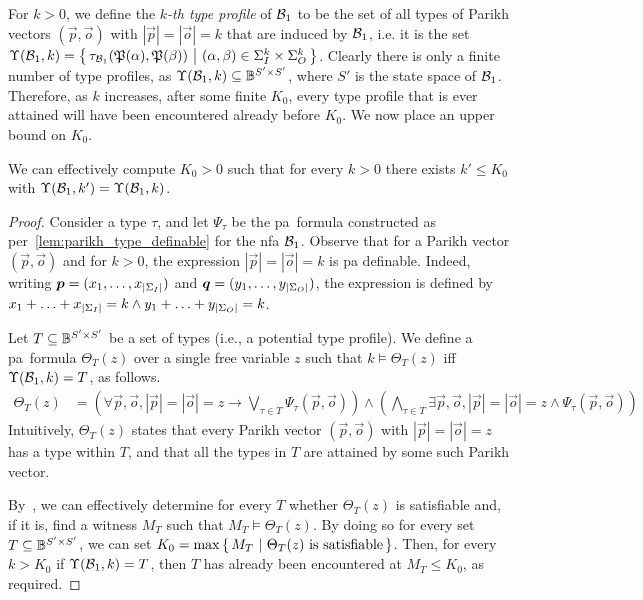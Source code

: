 For $k>0$, we define the \emph{$k$-th type profile} of $\mathcal{B}_1$ to be the set of all types of Parikh vectors $(\vec{p},\vec{o})$ with $|\vec{p}|=|\vec{o}|=k$ that are induced by $\mathcal{B}_1$, i.e. it is the set $\Upsilon(\mathcal{B}_1,k)=\left\{\,\tau_{\mathcal{B}_1}(\mathfrak{P}(\alpha),\mathfrak{P}(\beta))\ \middle|\ (\alpha,\beta)\in \Sigma_{I}^k \times \Sigma_{O}^k\,\right\}$. Clearly there is only a finite number of type profiles, as $\Upsilon(\mathcal{B}_1,k)\subseteq \mathbb{B}^{S'\times S'}$, where $S'$ is the state space of $\mathcal{B}_1$. Therefore, as $k$ increases, after some finite $K_0$, every type profile that is ever attained will have been encountered already before $K_0$. We now place an upper bound on $K_0$.

\begin{lemma}
	\label{lem:type_profile_bound}
	We can effectively compute $K_0>0$ such that for every $k>0$ there exists $k'\le K_0$ with $\Upsilon(\mathcal{B}_1,k')=\Upsilon(\mathcal{B}_1,k)$.
	\end{lemma}
\begin{proof}
	Consider a type $\tau$, and let $\Psi_\tau$ be the \gls{pa}~formula constructed as per~\cref{lem:parikh_type_definable} for the \gls{nfa} $\mathcal{B}_1$. Observe that for a Parikh vector $(\vec{p},\vec{o})$ and for $k>0$, the expression $|\vec{p}|=|\vec{o}|=k$ is \gls{pa} definable. Indeed, writing $\boldsymbol{p}=(x_1,\ldots,x_{|\Sigma_{I}|})$ and $\boldsymbol{q}=(y_1,\ldots,y_{|\Sigma_{O}|})$, the expression is defined by $x_1+\ldots+x_{|\Sigma_{I}|}=k \wedge y_1+\ldots+y_{|\Sigma_{O}|}=k$.
	
	Let $T\subseteq \mathbb{B}^{S'\times S'}$ be a set of types (i.e., a potential type profile). We define a \gls{pa}~formula $\Theta_T(z)$ over a single free variable $z$ such that $k\models \Theta_T(z)$ iff $\Upsilon(\mathcal{B}_1,k)=T$, as follows.
	\begin{align*}
		\Theta_T(z)&=\left(\forall \vec{p},\vec{o}, |\vec{p}|=|\vec{o}|=z \to \bigvee_{\tau\in T}\Psi_\tau(\vec{p},\vec{o})\right)
		\wedge \left(\bigwedge_{\tau\in T}\exists \vec{p},\vec{o}, |\vec{p}|=|\vec{o}|=z \wedge \Psi_\tau(\vec{p},\vec{o})\right)
	\end{align*}
Intuitively, $\Theta_T(z)$ states that every Parikh vector $(\vec{p},\vec{o})$ with $|\vec{p}|=|\vec{o}|=z$ has a type within $T$, and that all the types in $T$ are attained by some such Parikh vector.

By~\cite{Fischer1974,Borosh1976}, we can effectively determine for every $T$ whether $\Theta_T(z)$ is satisfiable and, if it is, find a witness $M_T$ such that $M_T\models \Theta_T(z)$. By doing so for every set $T\subseteq \mathbb{B}^{S'\times S'}$, we can set $K_0=\max\left\{\,M_T\ \middle|\ \Theta_T(z) \text{ is satisfiable}\,\right\}$. Then, for every $k>K_0$ if $\Upsilon(\mathcal{B}_1,k)=T$, then $T$ has already been encountered at $M_T\le K_0$, as required. 
\end{proof}

